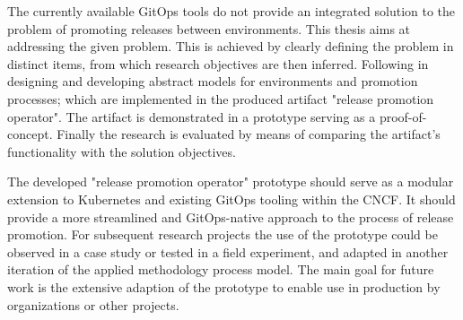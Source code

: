 \noindent
The currently available GitOps tools
do not provide an integrated solution to
the problem of promoting releases between environments.
This thesis aims at addressing the given problem.
This is achieved by
clearly defining the problem in distinct items,
from which research objectives are then inferred.
Following in designing and developing abstract models for
environments and promotion processes;
which are implemented in the produced artifact "release promotion operator".
The artifact is demonstrated in a prototype serving as a proof-of-concept.
Finally the research is evaluated by means of
comparing the artifact's functionality with the solution objectives.
\bigskip

\noindent
The developed "release promotion operator" prototype should serve as
a modular extension to Kubernetes and existing GitOps tooling within the CNCF.
It should provide a more streamlined and GitOps-native approach
to the process of release promotion.
For subsequent research projects the use of the prototype could
be observed in a case study or tested in a field experiment,
and adapted in another iteration of the applied methodology process model.
The main goal for future work is the extensive adaption of the prototype
to enable use in production by organizations or other projects.






























